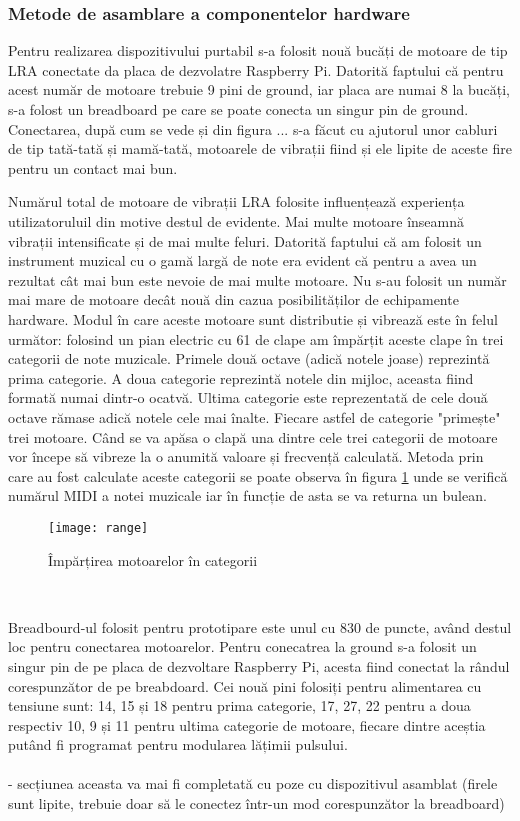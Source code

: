 \documentclass[../IoMusT.tex]{subfiles}
\begin{document}
\subsubsection{Metode de asamblare a componentelor hardware}
Pentru realizarea dispozitivului purtabil s-a folosit nouă bucăți de motoare de tip LRA conectate da placa de dezvolatre Raspberry Pi. Datorită faptului că pentru acest număr de motoare trebuie 9 pini de ground, iar placa are numai 8 la bucăți, s-a folost un breadboard  pe care se poate conecta un singur pin de ground. Conectarea, după cum se vede și din figura ... s-a făcut cu ajutorul unor cabluri de tip tată-tată și mamă-tată, motoarele de vibrații fiind și ele lipite  de aceste fire pentru un contact mai bun.
\\
\par Numărul total de motoare de vibrații LRA folosite influențează experiența utilizatoruluil din motive destul de evidente. Mai multe motoare înseamnă vibrații intensificate și de mai multe feluri. Datorită faptului că am folosit un instrument muzical cu o gamă largă de note era evident că pentru a avea un rezultat cât mai bun este nevoie de mai multe motoare. Nu s-au folosit un număr mai mare de motoare decât nouă din cazua posibilităților de echipamente hardware. Modul în care aceste motoare sunt distributie și vibrează este în felul următor: folosind un pian electric cu 61 de clape am împărțit aceste clape în trei categorii de note muzicale. Primele două octave (adică notele joase) reprezintă prima categorie. A doua categorie reprezintă notele din mijloc, aceasta fiind formată numai dintr-o ocatvă. Ultima categorie este reprezentată de cele două octave rămase adică notele cele mai înalte. Fiecare astfel de categorie "primește"  trei motoare. Când se va apăsa o clapă una dintre cele trei categorii de motoare vor începe să vibreze la o anumită valoare și frecvență calculată. Metoda prin care au fost calculate aceste categorii se poate observa în figura \ref{fig:range} unde se verifică numărul MIDI a notei muzicale iar în funcție de asta se va returna un bulean.
\begin{figure}[h]
\centering
\texttt{[image: range]}
\caption{Împărțirea motoarelor în categorii}
\label{fig:range}
\end{figure}  
\\
\par Breadbourd-ul folosit pentru prototipare este unul cu 830 de puncte, având destul loc pentru conectarea motoarelor. Pentru conecatrea la ground s-a folosit un singur pin de pe placa de dezvoltare  Raspberry Pi, acesta fiind conectat la rândul corespunzător de pe breabdoard. Cei nouă pini folosiți pentru alimentarea cu tensiune sunt: 14, 15 și 18 pentru prima categorie, 17, 27, 22 pentru a doua respectiv 10, 9 și 11 pentru ultima categorie de motoare, fiecare dintre aceștia putând fi programat pentru modularea lățimii pulsului.
\\
\\
- secțiunea aceasta va mai fi completată cu poze cu dispozitivul asamblat (firele sunt lipite, trebuie doar să le conectez într-un mod corespunzător la breadboard)
\end{document}
